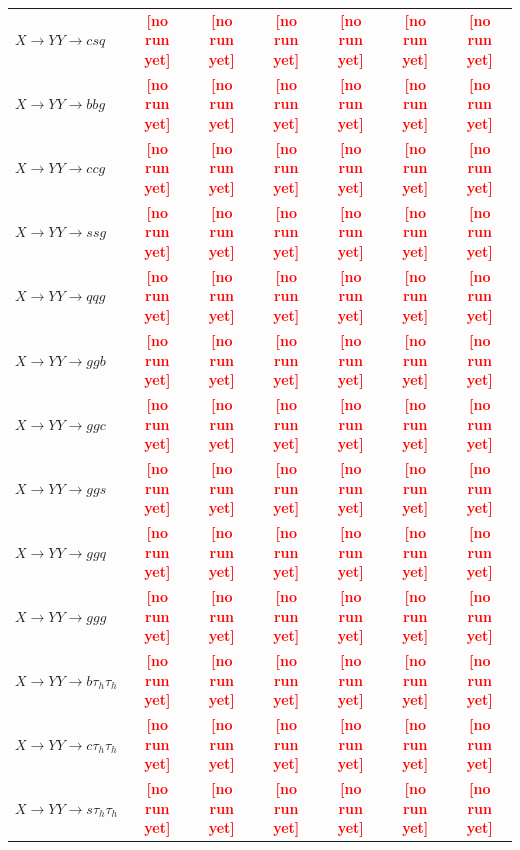 \documentclass[12pt]{article}   %
\newcommand{\pending}[1]{\textcolor{red}{\textbf{[#1]}}}
\begin{document}
\begin{landscape}
{\begin{longtable}{@{\extracolsep{\fill}}lcccccc@{}}
$X\to YY\to csq$ & \pending{no run yet} & \pending{no run yet} & \pending{no run yet} & \pending{no run yet} & \pending{no run yet} & \pending{no run yet} \\
$X\to YY\to bbg$ & \pending{no run yet} & \pending{no run yet} & \pending{no run yet} & \pending{no run yet} & \pending{no run yet} & \pending{no run yet} \\
$X\to YY\to ccg$ & \pending{no run yet} & \pending{no run yet} & \pending{no run yet} & \pending{no run yet} & \pending{no run yet} & \pending{no run yet} \\
$X\to YY\to ssg$ & \pending{no run yet} & \pending{no run yet} & \pending{no run yet} & \pending{no run yet} & \pending{no run yet} & \pending{no run yet} \\
$X\to YY\to qqg$ & \pending{no run yet} & \pending{no run yet} & \pending{no run yet} & \pending{no run yet} & \pending{no run yet} & \pending{no run yet} \\
$X\to YY\to ggb$ & \pending{no run yet} & \pending{no run yet} & \pending{no run yet} & \pending{no run yet} & \pending{no run yet} & \pending{no run yet} \\
$X\to YY\to ggc$ & \pending{no run yet} & \pending{no run yet} & \pending{no run yet} & \pending{no run yet} & \pending{no run yet} & \pending{no run yet} \\
$X\to YY\to ggs$ & \pending{no run yet} & \pending{no run yet} & \pending{no run yet} & \pending{no run yet} & \pending{no run yet} & \pending{no run yet} \\
$X\to YY\to ggq$ & \pending{no run yet} & \pending{no run yet} & \pending{no run yet} & \pending{no run yet} & \pending{no run yet} & \pending{no run yet} \\
$X\to YY\to ggg$ & \pending{no run yet} & \pending{no run yet} & \pending{no run yet} & \pending{no run yet} & \pending{no run yet} & \pending{no run yet} \\
\midrule
$X\to YY\to b\tau_h\tau_h$ & \pending{no run yet} & \pending{no run yet} & \pending{no run yet} & \pending{no run yet} & \pending{no run yet} & \pending{no run yet} \\
$X\to YY\to c\tau_h\tau_h$ & \pending{no run yet} & \pending{no run yet} & \pending{no run yet} & \pending{no run yet} & \pending{no run yet} & \pending{no run yet} \\
$X\to YY\to s\tau_h\tau_h$ & \pending{no run yet} & \pending{no run yet} & \pending{no run yet} & \pending{no run yet} & \pending{no run yet} & \pending{no run yet} \\

\end{longtable}}
\end{landscape}
\end{document}
